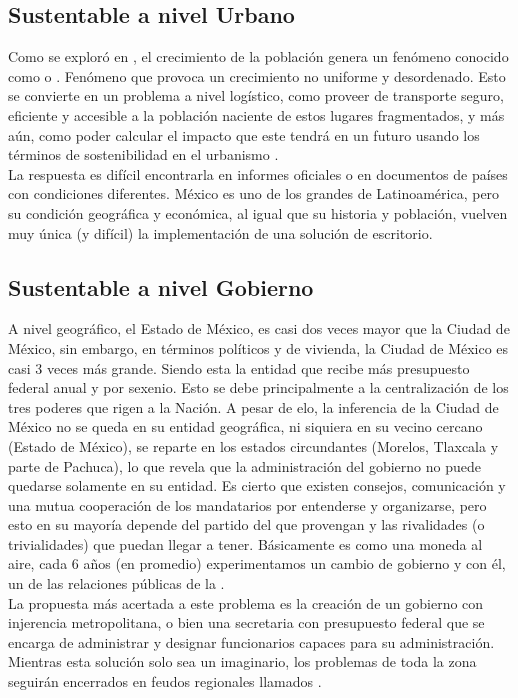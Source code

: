 \subsection{Sustentable a nivel Urbano}

Como se exploró en , el crecimiento de la población genera un fenómeno 
conocido como  o  \cite{jia2010}. Fenómeno que provoca un crecimiento 
no uniforme y desordenado. Esto se convierte en un problema a nivel logístico, como proveer de transporte seguro, 
eficiente y accesible a la población naciente de estos lugares fragmentados, y más aún, como poder calcular el impacto 
que este tendrá en un futuro usando los términos de sostenibilidad en el urbanismo .
\\ La respuesta es difícil encontrarla en informes oficiales o en documentos de países con condiciones diferentes. 
México es uno de los grandes de Latinoamérica, pero su condición geográfica y económica, al igual que su historia y 
población, vuelven muy única (y difícil) la implementación de una solución de escritorio.

\subsection{Sustentable a nivel Gobierno}

A nivel geográfico, el Estado de México, es casi dos veces mayor que la Ciudad de México, sin embargo, en términos 
políticos y de vivienda, la Ciudad de México es casi 3 veces más grande. Siendo esta la entidad que recibe más presupuesto 
federal anual y por sexenio. Esto se debe principalmente a la centralización de los tres poderes que rigen a la Nación. 
A pesar de elo, la inferencia de la Ciudad de México no se queda en su entidad geográfica, ni siquiera en su vecino cercano 
(Estado de México), se reparte en los estados circundantes (Morelos, Tlaxcala y parte de Pachuca), lo que revela que la 
administración del gobierno no puede quedarse solamente en su entidad. Es cierto que existen consejos, comunicación y una mutua 
cooperación de los mandatarios por entenderse y organizarse, pero esto en su mayoría depende del partido del que provengan y 
las rivalidades (o trivialidades) que puedan llegar a tener. Básicamente es como una moneda al aire, cada 6 años (en promedio) 
experimentamos un cambio de gobierno y con él, un  de las relaciones públicas de la \zmvm. \\
La propuesta más acertada a este problema es la creación de un gobierno con injerencia metropolitana, o bien una secretaria 
con presupuesto federal que se encarga de administrar y designar funcionarios capaces para su administración. Mientras 
esta solución solo sea un imaginario, los problemas de toda la zona seguirán encerrados en feudos regionales llamados 
.